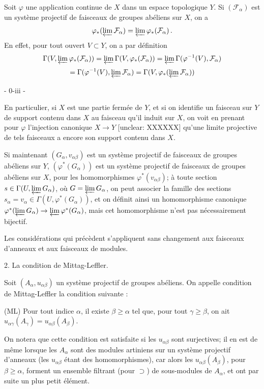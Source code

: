 Soit $\varphi$ une application continue de $X$ dans un espace topologique $Y$. Si $(\mathcal{F}_\alpha)$ est un système projectif de faisceaux de groupes abéliens sur $X$, on a
$$\varphi_*(\varprojlim \mathcal{F}_\alpha) = \varprojlim \varphi_*(\mathcal{F}_\alpha) \,.$$
En effet, pour tout ouvert $V \subset Y$, on a par définition
$$\Gamma(V, \varprojlim \varphi_*(\mathcal{F}_\alpha)) = \varprojlim \Gamma(V, \varphi_*(\mathcal{F}_\alpha)) = \varprojlim \Gamma(\varphi^{-1}(V), \mathcal{F}_\alpha)$$
$$= \Gamma(\varphi^{-1}(V), \varprojlim \mathcal{F}_\alpha) = \Gamma(V, \varphi_*(\varprojlim \mathcal{F}_\alpha))$$

\newpage


- 0-iii -

En particulier, si $X$ est une partie fermée de $Y$, et si on identifie un faisceau sur $Y$ de support contenu dans $X$ au faisceau qu'il induit sur $X$, on voit en prenant pour $\varphi$ l'injection canonique $X \to Y$ [unclear: XXXXXX] qu'une limite projective de tels faisceaux a encore son support contenu dans $X$.

Si maintenant $(G_{\alpha}, v_{\alpha\beta})$ est un système projectif de faisceaux de groupes abéliens sur $Y$, $(\varphi^*(G_{\alpha}))$ est un système projectif de faisceaux de groupes abéliens sur $X$, pour les homomorphismes $\varphi^*(v_{\alpha\beta})$; à toute section $s \in \Gamma(U, \varprojlim G_{\alpha})$, où $G = \varprojlim G_{\alpha}$, on peut associer la famille des sections $s_{\alpha} = v_{\alpha} \in \Gamma(U, \varphi^*(G_{\alpha}))$, et on définit ainsi un homomorphisme canonique $\varphi^*(\varprojlim G_{\alpha}) \to \varprojlim \varphi^*(G_{\alpha})$, mais cet homomorphisme n'est pas nécessairement bijectif.

Les considérations qui précèdent s'appliquent sans changement aux faisceaux d'anneaux et aux faisceaux de modules.

2. La condition de Mittag-Leffler.

Soit $(A_{\alpha}, u_{\alpha\beta})$ un système projectif de groupes abéliens. On appelle condition de Mittag-Leffler la condition suivante :

(ML) Pour tout indice $\alpha$, il existe $\beta \geqslant \alpha$ tel que, pour tout $\gamma \geqslant \beta$, on ait $u_{\alpha\gamma}(A_{\gamma}) = u_{\alpha\beta}(A_{\beta})$.

On notera que cette condition est satisfaite si les $u_{\alpha\beta}$ sont surjectives; il en est de même lorsque les $A_{\alpha}$ sont des modules artiniens sur un système projectif d'anneaux (les $u_{\alpha\beta}$ étant des homomorphismes), car alors les $u_{\alpha\beta}(A_{\beta})$, pour $\beta \geqslant \alpha$, forment un ensemble filtrant (pour $\supset$) de sous-modules de $A_{\alpha}$, et ont par suite un plus petit élément.

